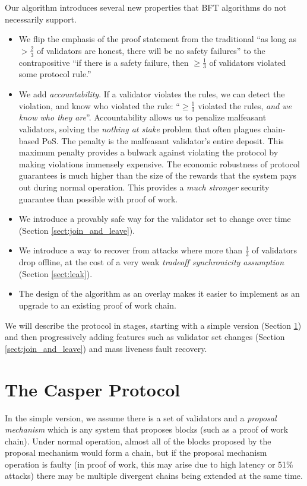 \documentclass[12pt, final]{article}
\begin{document}
Our algorithm introduces several new properties that BFT algorithms do not necessarily support.
\begin{itemize}
\item We flip the emphasis of the proof statement from the traditional ``as long as $>\frac{2}{3}$ of validators are honest, there will be no safety failures'' to the contrapositive ``if there is a safety failure, then $\ge \frac{1}{3}$ of validators violated some protocol rule.''

\item We add \textit{accountability}.  If a validator violates the rules, we can detect the violation, and know who violated the rule: ``$\ge \frac{1}{3}$ violated the rules, \textit{and we know who they are}''.  Accountability allows us to penalize malfeasant validators, solving the \textit{nothing at stake} problem\cite{} that often plagues chain-based PoS. The penalty is the malfeasant validator's entire deposit.  This maximum penalty provides a bulwark against violating the protocol by making violations immensely expensive.  The economic robustness of protocol guarantees is much higher than the size of the rewards that the system pays out during normal operation.  This provides a \textit{much stronger} security guarantee than possible with proof of work.

\item We introduce a provably safe way for the validator set to change over time (Section \ref{sect:join_and_leave}).
\item We introduce a way to recover from attacks where more than $\frac{1}{3}$ of validators drop offline, at the cost of a very weak \textit{tradeoff synchronicity assumption} (Section \ref{sect:leak}).
\item The design of the algorithm as an overlay makes it easier to implement as an upgrade to an existing proof of work chain.
\end{itemize}

We will describe the protocol in stages, starting with a simple version (Section \ref{sect:protocol}) and then progressively adding features such as validator set changes (Section \ref{sect:join_and_leave}) and mass liveness fault recovery.

\section{The Casper Protocol}
\label{sect:protocol}
In the simple version, we assume there is a set of validators and a \textit{proposal mechanism} which is any system that proposes blocks (such as a proof of work chain). Under normal operation, almost all of the blocks proposed by the proposal mechanism would form a chain, but if the proposal mechanism operation is faulty (in proof of work, this may arise due to high latency or 51\% attacks) there may be multiple divergent chains being extended at the same time.
\end{document}
